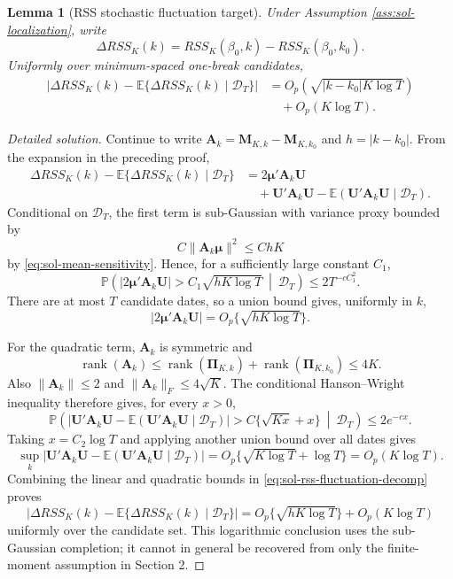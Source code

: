 \documentclass[12pt]{article}
\numberwithin{equation}{section}
\newtheorem{lemma}{Lemma}
\theoremstyle{definition}
\newcommand{\E}{\mathbb E}
\newcommand{\Pp}{\mathbb P}
\begin{document}
\begin{lemma}[RSS stochastic fluctuation target]
\label{lem:wb-rss-fluctuation}
Under Assumption \ref{ass:sol-localization}, write
\[
    \Delta RSS_K(k)=RSS_K(\beta_0,k)-RSS_K(\beta_0,k_0).
\]
Uniformly over minimum-spaced one-break candidates,
\begin{align*}
    \left|\Delta RSS_K(k)
    -\E\{\Delta RSS_K(k)\mid \mathcal D_T\}\right|
    &=O_p\!\left(\sqrt{|k-k_0|K\log T}\right) \\
    &\quad +O_p(K\log T).
\end{align*}
\end{lemma}


\begin{proof}[Detailed solution]
Continue to write \(\bm A_k=\bm M_{K,k}-\bm M_{K,k_0}\) and
\(h=|k-k_0|\).  From the expansion in the preceding proof,
\begin{align}
    \Delta RSS_K(k)
    -\E\{\Delta RSS_K(k)\mid\mathcal D_T\}
    &=2\bm\mu'\bm A_k\bm U\\
    &\quad+
      \bm U'\bm A_k\bm U
      -\E(\bm U'\bm A_k\bm U\mid\mathcal D_T).
    \label{eq:sol-rss-fluctuation-decomp}
\end{align}
Conditional on \(\mathcal D_T\), the first term is sub-Gaussian with variance
proxy bounded by
\[
    C\|\bm A_k\bm\mu\|^2\leq ChK
\]
by \eqref{eq:sol-mean-sensitivity}.  Hence, for a sufficiently large constant
\(C_1\),
\[
    \Pp\left(
      |2\bm\mu'\bm A_k\bm U|>
      C_1\sqrt{hK\log T}
      \ \middle|\ \mathcal D_T
    \right)\leq 2T^{-cC_1^2}.
\]
There are at most \(T\) candidate dates, so a union bound gives, uniformly in
\(k\),
\[
    |2\bm\mu'\bm A_k\bm U|
    =O_p\{\sqrt{hK\log T}\}.
\]

For the quadratic term, \(\bm A_k\) is symmetric and
\[
    \operatorname{rank}(\bm A_k)
    \leq\operatorname{rank}(\bm\Pi_{K,k})+
       \operatorname{rank}(\bm\Pi_{K,k_0})
    \leq4K.
\]
Also \(\|\bm A_k\|\leq2\) and
\(\|\bm A_k\|_F\leq4\sqrt K\).  The conditional Hanson--Wright inequality
therefore gives, for every \(x>0\),
\[
    \Pp\left(
      |\bm U'\bm A_k\bm U-
        \E(\bm U'\bm A_k\bm U\mid\mathcal D_T)|
      >C\{\sqrt{Kx}+x\}
      \ \middle|\ \mathcal D_T
    \right)
    \leq2e^{-cx}.
\]
Taking \(x=C_2\log T\) and applying another union bound over all dates gives
\[
    \sup_k
    |\bm U'\bm A_k\bm U-
      \E(\bm U'\bm A_k\bm U\mid\mathcal D_T)|
    =O_p\{\sqrt{K\log T}+\log T\}
    =O_p(K\log T).
\]
Combining the linear and quadratic bounds in
\eqref{eq:sol-rss-fluctuation-decomp} proves
\[
    \left|\Delta RSS_K(k)
    -\E\{\Delta RSS_K(k)\mid\mathcal D_T\}\right|
    =O_p\{\sqrt{hK\log T}\}+O_p(K\log T)
\]
uniformly over the candidate set.  This logarithmic conclusion uses the
sub-Gaussian completion; it cannot in general be recovered from only the
finite-moment assumption in Section 2.
\end{proof}
\end{document}
